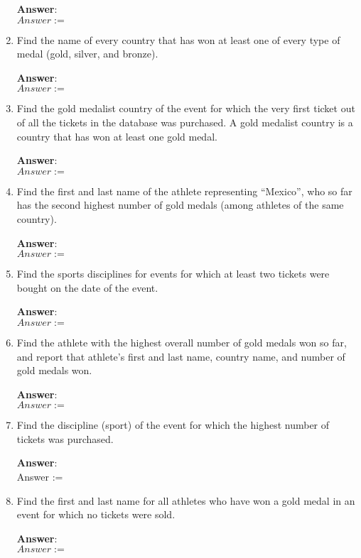 \documentclass{article}
\begin{document}
\begin{enumerate}
{\bf Answer}:\\[5pt]
{
$
Answer := 
$
}


\item   %
Find the name of every country that has won at least one of every type of medal 
(gold, silver, and bronze).

{\bf Answer}:\\[5pt]
{
$
Answer := 
$
}


\item   %
Find the gold medalist country of the event for which the very first ticket out of 
all the tickets in the database was purchased. A gold medalist country is a country
that has won at least one gold medal. 
 
{\bf Answer}:\\[5pt]
{
$
Answer := 
$
}


\item   %
Find the first and last name of the athlete representing ``Mexico'', who so far 
has the second highest number of gold medals (among athletes of the same country).

{\bf Answer}:\\[5pt]
{
$
Answer := 
$
}


\item   %
Find the sports disciplines for events for which at least two tickets 
were bought on the date of the event.

{\bf Answer}:\\[5pt]
{
$
Answer := 
$
}

\item   %
Find the athlete with the highest overall number of gold medals won so far, and report that athlete’s first and last name, country name, and number of gold medals won.

{\bf Answer}:\\[5pt]
{
$
Answer := 
$
}

\item   %
Find the discipline (sport) of the event for which the highest number of tickets was purchased. 

{\bf Answer}:\\[5pt]
{
Answer := 
}

\item   %
Find the first and last name for all athletes who have won a gold medal in an event for which no tickets were sold. 

{\bf Answer}:\\[5pt]
{
$
Answer := 
$
}

\end{enumerate}
\end{document}
